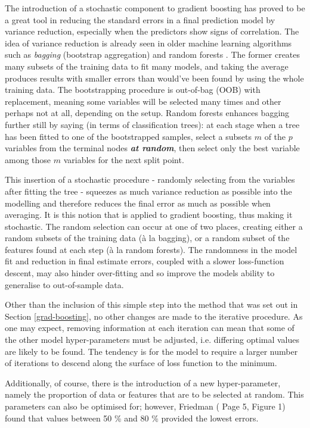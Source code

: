 \documentclass{article}
\begin{document}
The introduction of a stochastic component to gradient boosting has proved to be a great tool in reducing the standard errors in a final prediction model by variance reduction, especially when the predictors show signs of correlation. The idea of variance reduction is already seen in older machine learning algorithms such as \emph{bagging} (bootstrap aggregation) and random forests \cite{breiman2001random}. The former creates many subsets of the training data to fit many models, and taking the average produces results with smaller errors than would've been found by using the whole training data. The bootstrapping procedure is out-of-bag (OOB) with replacement, meaning some variables will be selected many times and other perhaps not at all, depending on the setup. Random forests enhances bagging further still by saying (in terms of classification trees): at each stage when a tree has been fitted to one of the bootstrapped samples, select a subsets $m$ of the $p$ variables from the terminal nodes \textbf{\emph{at random}}, then select only the best variable among those $m$ variables for the next split point.

This insertion of a stochastic procedure - randomly selecting from the variables after fitting the tree - squeezes as much variance reduction as possible into the modelling and therefore reduces the final error as much as possible when averaging. It is this notion that is applied to gradient boosting, thus making it stochastic. The random selection can occur at one of two places, creating either a random subsets of the training data (à la bagging), or a random subset of the features found at each step (à la random forests). The randomness in the model fit and reduction in final estimate errors, coupled with a slower loss-function descent, may also hinder over-fitting and so improve the models ability to generalise to out-of-sample data.

Other than the inclusion of this simple step into the method that was set out in Section \ref{grad-boosting}, no other changes are made to the iterative procedure. As one may expect, removing information at each iteration can mean that some of the other model hyper-parameters must be adjusted, i.e. differing optimal values are likely to be found. The tendency is for the model to require a larger number of iterations to descend along the surface of loss function to the minimum.

Additionally, of course, there is the introduction of a new hyper-parameter, namely the proportion of data or features that are to be selected at random. This parameters can also be optimised for; however, Friedman (\cite{friedmanstochastic} Page 5, Figure 1) found that values between 50 \% and 80 \% provided the lowest errors.
\end{document}
